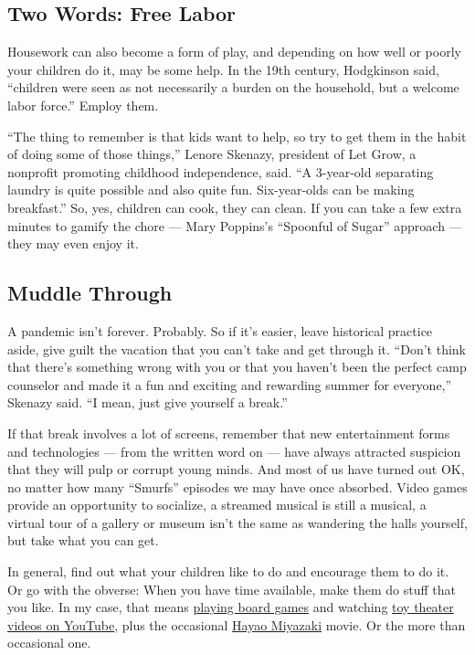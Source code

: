 \hypertarget{two-words-free-labor}{%
\subsection{Two Words: Free Labor}\label{two-words-free-labor}}

Housework can also become a form of play, and depending on how well or
poorly your children do it, may be some help. In the 19th century,
Hodgkinson said, ``children were seen as not necessarily a burden on the
household, but a welcome labor force.'' Employ them.

``The thing to remember is that kids want to help, so try to get them in
the habit of doing some of those things,'' Lenore Skenazy, president of
Let Grow, a nonprofit promoting childhood independence, said. ``A
3-year-old separating laundry is quite possible and also quite fun.
Six-year-olds can be making breakfast.'' So, yes, children can cook,
they can clean. If you can take a few extra minutes to gamify the chore
--- Mary Poppins's ``Spoonful of Sugar'' approach --- they may even
enjoy it.

\hypertarget{muddle-through}{%
\subsection{Muddle Through}\label{muddle-through}}

A pandemic isn't forever. Probably. So if it's easier, leave historical
practice aside, give guilt the vacation that you can't take and get
through it. ``Don't think that there's something wrong with you or that
you haven't been the perfect camp counselor and made it a fun and
exciting and rewarding summer for everyone,'' Skenazy said. ``I mean,
just give yourself a break.''

If that break involves a lot of screens, remember that new entertainment
forms and technologies --- from the written word on --- have always
attracted suspicion that they will pulp or corrupt young minds. And most
of us have turned out OK, no matter how many ``Smurfs'' episodes we may
have once absorbed. Video games provide an opportunity to socialize, a
streamed musical is still a musical, a virtual tour of a gallery or
museum isn't the same as wandering the halls yourself, but take what you
can get.

In general, find out what your children like to do and encourage them to
do it. Or go with the obverse: When you have time available, make them
do stuff that you like. In my case, that means
\href{https://www.nytimes3xbfgragh.onion/2020/04/30/arts/board-games-soothing-virus.html}{playing
board games} and watching
\href{https://www.youtube.com/watch?v=bF7q37SfF4w}{toy theater videos on
YouTube}, plus the occasional
\href{https://www.nytimes3xbfgragh.onion/2020/05/27/movies/studio-ghibli-hbo-max.html}{Hayao
Miyazaki} movie. Or the more than occasional one.

